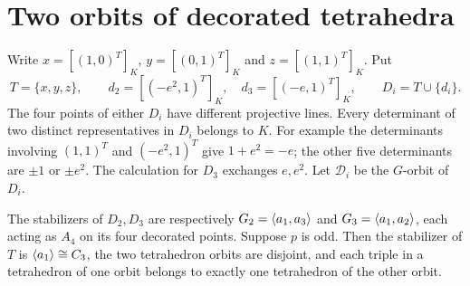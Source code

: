\section{Two orbits of decorated tetrahedra}

Write $x=[(1,0)^T]_K$, $y=[(0,1)^T]_K$ and $z=[(1,1)^T]_K$.
Put
\[
 T=\{x,y,z\},\qquad d_2=[(-e^2,1)^T]_K,\quad
 d_3=[(-e,1)^T]_K,\qquad D_i=T\cup\{d_i\}.
\]
The four points of either $D_i$ have different projective lines.
Every determinant of two distinct representatives in $D_i$ belongs
to $K$. For example the determinants involving $(1,1)^T$ and
$(-e^2,1)^T$ give $1+e^2=-e$; the other five determinants are
$\pm1$ or $\pm e^2$. The calculation for $D_3$ exchanges $e,e^2$.
Let $\mathcal D_i$ be the $G$-orbit of $D_i$.

\begin{lemma}\label{tetra-stabilizers}
The stabilizers of $D_2,D_3$ are respectively
$G_2=\langle a_1,a_3\rangle$ and $G_3=\langle a_1,a_2\rangle$, each acting as
$A_4$ on its four decorated points. Suppose $p$ is odd.
Then the stabilizer of $T$ is $\langle a_1\rangle\cong C_3$,
the two tetrahedron orbits are disjoint, and each triple in a
tetrahedron of one orbit belongs to exactly one tetrahedron of
the other orbit.
\end{lemma}
